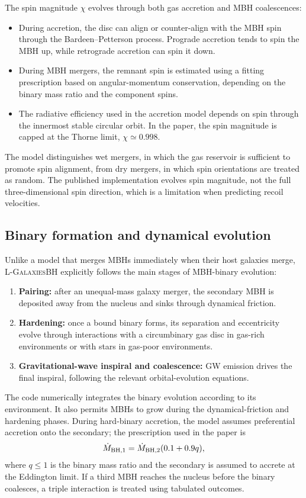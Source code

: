 \documentclass[11pt,a4paper]{article}
\newcommand{\Lgalbh}{\textsc{L-GalaxiesBH}}
\begin{document}
The spin magnitude $\chi$ evolves through both gas accretion and MBH coalescences:
\begin{itemize}
  \item During accretion, the disc can align or counter-align with the MBH spin through the Bardeen--Petterson process. Prograde accretion tends to spin the MBH up, while retrograde accretion can spin it down.
  \item During MBH mergers, the remnant spin is estimated using a fitting prescription based on angular-momentum conservation, depending on the binary mass ratio and the component spins.
  \item The radiative efficiency used in the accretion model depends on spin through the innermost stable circular orbit. In the paper, the spin magnitude is capped at the Thorne limit, $\chi\simeq0.998$.
\end{itemize}

The model distinguishes wet mergers, in which the gas reservoir is sufficient to promote spin alignment, from dry mergers, in which spin orientations are treated as random. The published implementation evolves spin magnitude, not the full three-dimensional spin direction, which is a limitation when predicting recoil velocities.

\subsection{Binary formation and dynamical evolution}

Unlike a model that merges MBHs immediately when their host galaxies merge, \Lgalbh{} explicitly follows the main stages of MBH-binary evolution:
\begin{enumerate}
  \item \textbf{Pairing:} after an unequal-mass galaxy merger, the secondary MBH is deposited away from the nucleus and sinks through dynamical friction.
  \item \textbf{Hardening:} once a bound binary forms, its separation and eccentricity evolve through interactions with a circumbinary gas disc in gas-rich environments or with stars in gas-poor environments.
  \item \textbf{Gravitational-wave inspiral and coalescence:} GW emission drives the final inspiral, following the relevant orbital-evolution equations.
\end{enumerate}

The code numerically integrates the binary evolution according to its environment. It also permits MBHs to grow during the dynamical-friction and hardening phases. During hard-binary accretion, the model assumes preferential accretion onto the secondary; the prescription used in the paper is
\begin{equation}
 \dot M_{\rm BH,1}=\dot M_{\rm BH,2}(0.1+0.9q),
\end{equation}
where $q\leq1$ is the binary mass ratio and the secondary is assumed to accrete at the Eddington limit. If a third MBH reaches the nucleus before the binary coalesces, a triple interaction is treated using tabulated outcomes.
\end{document}
